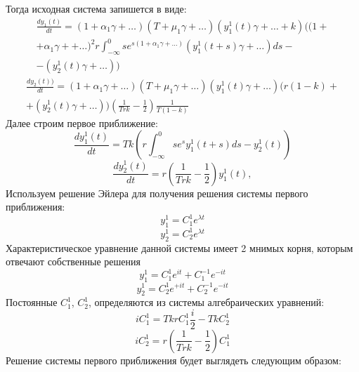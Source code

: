 \documentclass[12pt]{article}
\begin{document}
  Тогда исходная система запишется в виде:
  \begin{multline}
      \label{system1}
       \frac{d y_1(t)}{d t}=(1+\alpha_1 \gamma+\ldots) (T+\mu_1 \gamma+\ldots)(y_1^1(t) \gamma+\ldots+k)( (1+\\+\alpha_1 \gamma++\ldots)^2 r  \int_{-\infty}^{0} s e^{s (1+\alpha_1 \gamma + \ldots)} ( y_1^1(t+s)\gamma +\ldots)d s -\\- (y_2^1(t) \gamma+\ldots ))
  \end{multline}
  \begin{multline*}
     \frac{d y_2(t))}{d t}=(1+\alpha_1 \gamma+\ldots) (T+\mu_1 \gamma+\ldots)(y_1^1(t) \gamma + \ldots)( r(1-k) +\\+( y_2^1(t)\gamma+\ldots) )\left( \frac{1}{T r k} - \frac{1}{2}\right)\frac{1}{T(1-k)}
  \end{multline*}
  Далее строим первое приближение:
  \begin{equation}\label{s1}
      \frac{d y^1_1(t)}{d t}=T k (r \int_{-\infty}^{0} s e^{s}y^1_1(t+s)d s -  y^1_2 (t) ) 
  \end{equation}
\begin{equation*}
   \frac{d y^1_2(t)}{d t}= r(\frac{1}{T r k} -\frac{1}{2})y^1_1(t) ,
\end{equation*}
 Используем решение Эйлера для получения решения системы первого приближения:
 \begin{equation*}
    y_1^1=C_1^1 e^{\lambda t}
 \end{equation*}
 \begin{equation*}
    y_2^1=C_2^1 e^{\lambda t}
 \end{equation*}
 Характеристическое уравнение данной системы имеет 2 мнимых корня, которым отвечают собственные решения 
 \begin{equation*}
    y_1^1=C_1^1 e^{i t}+C_1^{-1} e^{-i t}
 \end{equation*}
 \begin{equation*}
    y_2^1=C_2^1 e^{+i t}+C_2^{-1} e^{-i t}
 \end{equation*}
 Постоянные $C_1^1$, $C_2^1$, определяются из системы алгебраических уравнений:
 \begin{equation*}
     i C_1^1=T k r C_1^1 \frac{i}{2}- T k C_2^1
 \end{equation*}
 \begin{equation*}
     i C_2^1=r \left(  \frac{1}{T r k} - \frac{1}{2}\right) C_1^1
 \end{equation*}
 Решение системы первого приближения будет выглядеть следующим образом:
\end{document}
